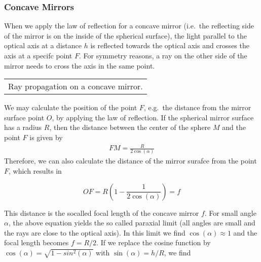 \documentclass[letterpaper,10pt,english]{sphinxmanual}
\begin{document}
\subsubsection{Concave Mirrors}
\label{\detokenize{notebooks/L2/Optical Elements:Concave-Mirrors}}
When we apply the law of reflection for a concave mirror (i.e. the reflecting side of the mirror is on the inside of the spherical surface), the light parallel to the optical axis at a distance \(h\) is reflected towards the optical axis and crosses the axis at a specifc point \(F\). For symmetry reasons, a ray on the other side of the mirror needs to cross the axis in the same point.


\begin{savenotes}\sphinxattablestart
\centering
\begin{tabulary}{\linewidth}[t]{|T|}
\hline
\sphinxstyletheadfamily 
{}
\\
\hline
{} Ray propagation on a concave mirror.
\\
\hline
\end{tabulary}
\par
\sphinxattableend\end{savenotes}

We may calculate the position of the point \(F\), e.g. the distance from the mirror surface point \(O\), by applying the law of reflection. If the spherical mirror surface has a radius \(R\), then the distance between the center of the sphere \(M\) and the point \(F\) is given by
\begin{equation*}
\begin{split}FM=\frac{R}{2\cos(\alpha)}\end{split}
\end{equation*}
Therefore, we can also calculate the distance of the mirror surafce from the point \(F\), which results in

\begin{equation}
OF=R\left (1-\frac{1}{2\cos(\alpha)}\right)=f
\end{equation}

This distance is the so\sphinxhyphen{}called focal length of the concave mirror \(f\). For small angle \(\alpha\), the above equation yields the so called paraxial limit (all angles are small and the rays are close to the optical axis). In this limit we find \(\cos(\alpha)\approx 1\) and the focal length becomes \(f=R/2\). If we replace the cosine function by \(\cos(\alpha)=\sqrt{1-sin^2(\alpha)}\) with \(\sin(\alpha)=h/R\), we find
\end{document}
